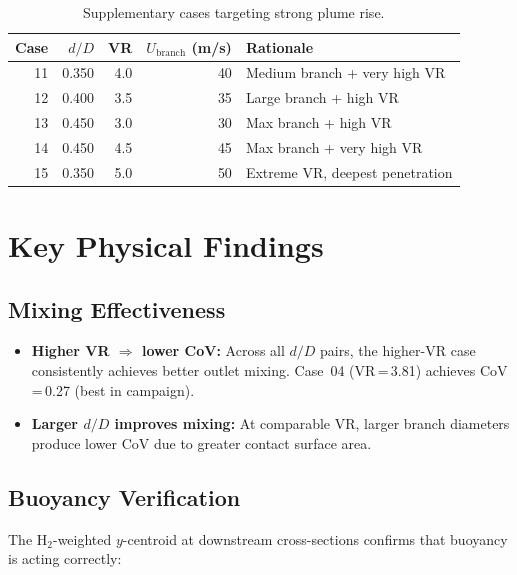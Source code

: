 \documentclass[12pt,a4paper]{report}
\begin{document}
\begin{table}[H]
\centering
\caption{Supplementary cases targeting strong plume rise.}
\small
\begin{tabular}{@{}rrrrl@{}}
\toprule
\textbf{Case} & $d/D$ & VR & $U_{\mathrm{branch}}$ (m/s) & \textbf{Rationale} \\
\midrule
11 & 0.350 & 4.0 & 40 & Medium branch + very high VR \\
12 & 0.400 & 3.5 & 35 & Large branch + high VR \\
13 & 0.450 & 3.0 & 30 & Max branch + high VR \\
14 & 0.450 & 4.5 & 45 & Max branch + very high VR \\
15 & 0.350 & 5.0 & 50 & Extreme VR, deepest penetration \\
\bottomrule
\end{tabular}
\end{table}

\section{Key Physical Findings}

\subsection{Mixing Effectiveness}

\begin{itemize}
  \item \textbf{Higher VR $\Rightarrow$ lower CoV:}  Across all $d/D$
        pairs, the higher-VR case consistently achieves better outlet
        mixing.  Case~04 (VR\,=\,3.81) achieves CoV\,=\,0.27
        (best in campaign).
  \item \textbf{Larger $d/D$ improves mixing:}  At comparable VR,
        larger branch diameters produce lower CoV due to greater
        contact surface area.
\end{itemize}

\subsection{Buoyancy Verification}

The H$_2$-weighted $y$-centroid at downstream cross-sections confirms
that buoyancy is acting correctly:
\end{document}

